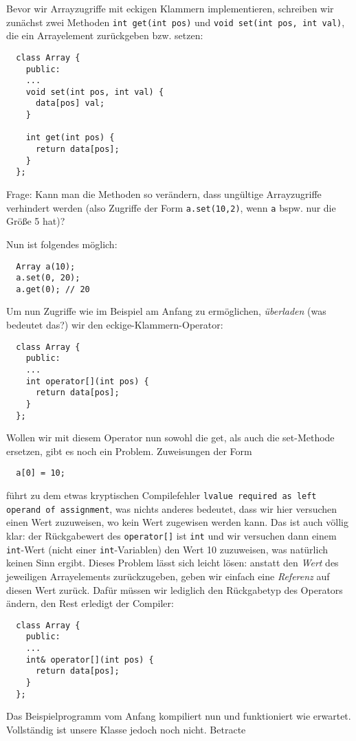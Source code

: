 \documentclass[
fontsize = 11pt,
paper    = a4,
BCOR     = 5mm,
DIV      = 12,
numbers  = noenddot,
]{scrartcl}
\def\MMS{\marginpar{%
    \vspace{-1.5em}%
    \begin{mdframed}[style=mms]%
~~???%
\end{mdframed}}}
\begin{document}
Bevor wir Arrayzugriffe mit eckigen Klammern implementieren, schreiben
wir zunächst zwei Methoden \lstinline{int get(int pos)} und
\lstinline{void set(int pos, int val)}, die ein Arrayelement
zurückgeben bzw. setzen:
\begin{lstlisting}
  class Array {
    public:
    ...
    void set(int pos, int val) {
      data[pos] val;
    }

    int get(int pos) {
      return data[pos];
    }
  };
\end{lstlisting}
Frage: Kann man die Methoden so verändern, dass ungültige
Arrayzugriffe verhindert werden (also Zugriffe der Form
\lstinline{a.set(10,2)}, wenn \lstinline{a} bspw. nur die Größe 5
hat)?\MMS

Nun ist folgendes möglich:
\begin{lstlisting}
  Array a(10);
  a.set(0, 20);
  a.get(0); // 20
\end{lstlisting}
Um nun Zugriffe wie im Beispiel am Anfang zu ermöglichen,
\emph{überladen} (was bedeutet das?\MMS) wir den
eckige-Klammern-Operator:
\begin{lstlisting}
  class Array {
    public:
    ...
    int operator[](int pos) {
      return data[pos];
    }
  };
\end{lstlisting}
Wollen wir mit diesem Operator nun sowohl die get, als auch die
set-Methode ersetzen, gibt es noch ein Problem. Zuweisungen der Form
\begin{lstlisting}
  a[0] = 10;
\end{lstlisting}
führt zu dem etwas kryptischen Compilefehler \texttt{lvalue required
  as left operand of assignment}, was nichts anderes bedeutet, dass
wir hier versuchen einen Wert zuzuweisen, wo kein Wert zugewisen
werden kann.  Das ist auch völlig klar: der Rückgabewert des
\lstinline{operator[]} ist \lstinline|int| und wir versuchen dann
einem \lstinline|int|-Wert (nicht einer \lstinline|int|-Variablen) den
Wert 10 zuzuweisen, was natürlich keinen Sinn ergibt. Dieses Problem
lässt sich leicht lösen: anstatt den \emph{Wert} des jeweiligen
Arrayelements zurückzugeben, geben wir einfach eine \emph{Referenz}
auf diesen Wert zurück. Dafür müssen wir lediglich den Rückgabetyp des
Operators ändern, den Rest erledigt der Compiler:
\begin{lstlisting}
  class Array {
    public:
    ...
    int& operator[](int pos) {
      return data[pos];
    }
  };
\end{lstlisting}
Das Beispielprogramm vom Anfang kompiliert nun und funktioniert wie
erwartet. Vollständig ist unsere Klasse jedoch noch nicht. Betracte
\end{document}
